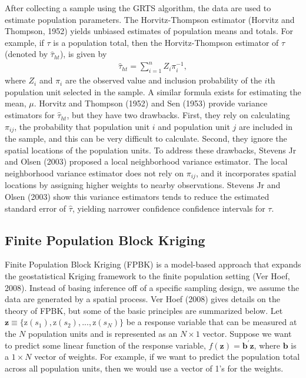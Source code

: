 \documentclass[]{elsarticle} %
\begin{document}
After collecting a sample using the GRTS algorithm, the data are used to
estimate population parameters. The Horvitz-Thompson estimator (Horvitz
and Thompson, 1952) yields unbiased estimates of population means and
totals. For example, if \(\tau\) is a population total, then the
Horvitz-Thompson estimator of \(\tau\) (denoted by \(\hat{\tau}_{ht}\)),
is given by \begin{align}\label{eq:ht}
  \hat{\tau}_{ht} = \sum_{i = 1}^n Z_i \pi_i^{-1},
\end{align} where \(Z_i\) and \(\pi_i\) are the observed value and
inclusion probability of the \(i\)th population unit selected in the
sample. A similar formula exists for estimating the mean, \(\mu\).
Horvitz and Thompson (1952) and Sen (1953) provide variance estimators
for \(\hat{\tau}_{ht}\), but they have two drawbacks. First, they rely
on calculating \(\pi_{ij}\), the probability that population unit \(i\)
and population unit \(j\) are included in the sample, and this can be
very difficult to calculate. Second, they ignore the spatial locations
of the population units. To address these drawbacks, Stevens Jr and
Olsen (2003) proposed a local neighborhood variance estimator. The local
neighborhood variance estimator does not rely on \(\pi_{ij}\), and it
incorporates spatial locations by assigning higher weights to nearby
observations. Stevens Jr and Olsen (2003) show this variance estimators
tends to reduce the estimated standard error of \(\hat{\tau}\), yielding
narrower confidence confidence intervals for \(\tau\).

\hypertarget{finite-population-block-kriging}{%
\subsection{Finite Population Block
Kriging}\label{finite-population-block-kriging}}

Finite Population Block Kriging (FPBK) is a model-based approach that
expands the geostatistical Kriging framework to the finite population
setting (Ver Hoef, 2008). Instead of basing inference off of a specific
sampling design, we assume the data are generated by a spatial process.
Ver Hoef (2008) gives details on the theory of FPBK, but some of the
basic principles are summarized below. Let
\(\mathbf{z} \equiv \{\text{z}(s_1), \text{z}(s_2), . . . , \text{z}(s_N) \}\)
be a response variable that can be measured at the \(N\) population
units and is represented as an \(N \times 1\) vector. Suppose we want to
predict some linear function of the response variable,
\(f(\mathbf{z}) = \mathbf{b}^\prime \mathbf{z}\), where \(\mathbf{b}\)
is a \(1 \times N\) vector of weights. For example, if we want to
predict the population total across all population units, then we would
use a vector of 1's for the weights.
\end{document}
